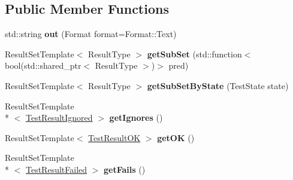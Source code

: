 \subsection*{Public Member Functions}
\begin{DoxyCompactItemize}
\item 
\hypertarget{class_l_test_source_1_1_result_set_mixin_a006605f4c7677f83f44c999726139cc4}{std\-::string {\bfseries out} (Format format=Format\-::\-Text)}\label{class_l_test_source_1_1_result_set_mixin_a006605f4c7677f83f44c999726139cc4}

\item 
\hypertarget{class_l_test_source_1_1_result_set_mixin_aacb3ffd21f0fb4c68ec3b5a4a4b2034a}{Result\-Set\-Template$<$ Result\-Type $>$ {\bfseries get\-Sub\-Set} (std\-::function$<$ bool(std\-::shared\-\_\-ptr$<$ Result\-Type $>$)$>$ pred)}\label{class_l_test_source_1_1_result_set_mixin_aacb3ffd21f0fb4c68ec3b5a4a4b2034a}

\item 
\hypertarget{class_l_test_source_1_1_result_set_mixin_ade1f7e916a5e9f2ebd233e54f7bd7ff8}{Result\-Set\-Template$<$ Result\-Type $>$ {\bfseries get\-Sub\-Set\-By\-State} (Test\-State state)}\label{class_l_test_source_1_1_result_set_mixin_ade1f7e916a5e9f2ebd233e54f7bd7ff8}

\item 
\hypertarget{class_l_test_source_1_1_result_set_mixin_a23244211cb65ca772d043f4a6db43246}{Result\-Set\-Template\\*
$<$ \hyperlink{class_l_test_source_1_1_test_result_ignored}{Test\-Result\-Ignored} $>$ {\bfseries get\-Ignores} ()}\label{class_l_test_source_1_1_result_set_mixin_a23244211cb65ca772d043f4a6db43246}

\item 
\hypertarget{class_l_test_source_1_1_result_set_mixin_a1c32579ec0ca68453cb79ed0a37a498b}{Result\-Set\-Template$<$ \hyperlink{class_l_test_source_1_1_test_result_o_k}{Test\-Result\-O\-K} $>$ {\bfseries get\-O\-K} ()}\label{class_l_test_source_1_1_result_set_mixin_a1c32579ec0ca68453cb79ed0a37a498b}

\item 
\hypertarget{class_l_test_source_1_1_result_set_mixin_a36054de22ebcb79429856db4a489b7ef}{Result\-Set\-Template\\*
$<$ \hyperlink{class_l_test_source_1_1_test_result_failed}{Test\-Result\-Failed} $>$ {\bfseries get\-Fails} ()}\label{class_l_test_source_1_1_result_set_mixin_a36054de22ebcb79429856db4a489b7ef}


\end{DoxyCompactItemize}
